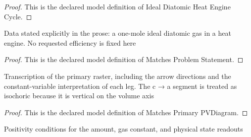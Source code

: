 \begin{proof}
  This is the declared model definition of Ideal Diatomic Heat Engine Cycle.
\end{proof}
\begin{definition}
  \label{def:physics:phyx-mini-0350:phyxminiproblems-problemphyxmini0350-matchesproblemstatement}
  Data stated explicitly in the prose: a one-mole ideal diatomic gas in a heat engine. No requested efficiency is fixed here
\end{definition}
\begin{proof}
  This is the declared model definition of Matches Problem Statement.
\end{proof}
\begin{definition}
  \label{def:physics:phyx-mini-0350:phyxminiproblems-problemphyxmini0350-matchesprimarypvdiagram}
  Transcription of the primary raster, including the arrow directions and the constant-variable interpretation of each leg. The c → a segment is treated as isochoric because it is vertical on the volume axis
\end{definition}
\begin{proof}
  This is the declared model definition of Matches Primary PVDiagram.
\end{proof}
\begin{definition}
  \label{def:physics:phyx-mini-0350:phyxminiproblems-problemphyxmini0350-hasphysicalthermodynamicparameters}
  Positivity conditions for the amount, gas constant, and physical state readouts
\end{definition}
